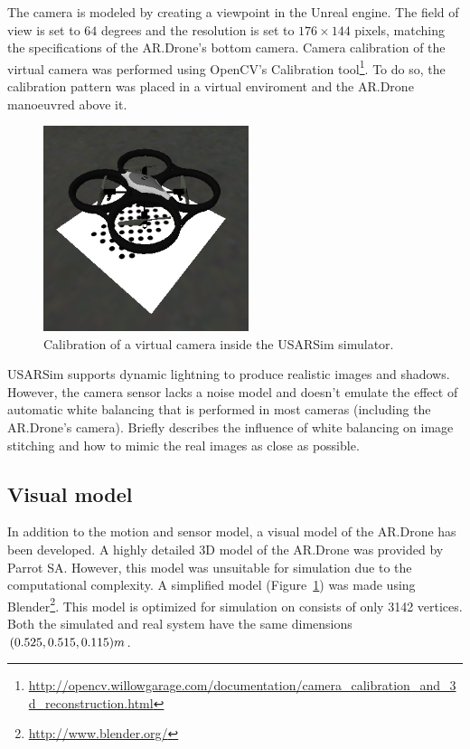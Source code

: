 The camera is modeled by creating a viewpoint in the Unreal engine.
The field of view is set to $64$ degrees and the resolution is set to $176 \times 144$ pixels, matching the specifications of the AR.Drone's bottom camera.
Camera calibration of the virtual camera was performed using OpenCV's Calibration tool\footnote{\url{http://opencv.willowgarage.com/documentation/camera_calibration_and_3d_reconstruction.html}}.
To do so, the calibration pattern was placed in a virtual enviroment and the AR.Drone manoeuvred above it.

\begin{figure}[htb!]
\centering
\includegraphics[width=6cm]{images/usarsim_camera_calibration.png}
\caption{Calibration of a virtual camera inside the USARSim simulator.} 
\label{fig:3Dmodel}
\end{figure}

USARSim supports dynamic lightning to produce realistic images and shadows.
However, the camera sensor lacks a noise model and doesn't emulate the effect of automatic white balancing that is performed in most cameras (including the AR.Drone's camera).
\cite{Visser2011imav} Briefly describes the influence of white balancing on image stitching and how to mimic the real images as close as possible.


		\subsection{Visual model}
In addition to the motion and sensor model, a visual model of the AR.Drone has been developed.
A highly detailed 3D model of the AR.Drone was provided by Parrot SA.
However, this model was unsuitable for simulation due to the computational complexity.
A simplified model (Figure~\ref{fig:3Dmodel}) was made using Blender\footnote{\url{http://www.blender.org/}}.
This model is optimized for simulation on consists of only 3142 vertices.
Both the simulated and real system have the same dimensions $(0.525,0.515,0.115)\small{m}$.

